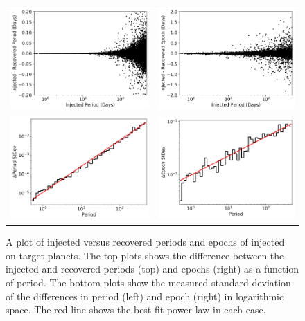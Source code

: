 \begin{figure}[ht]
\centering
\begin{tabular}{cc}
\includegraphics[width=0.5\linewidth]{INJ1-Ephem-Recovery-1.pdf} &
\includegraphics[width=0.5\linewidth]{INJ1-Ephem-Recovery-2.pdf} \\
\includegraphics[width=0.5\linewidth]{INJ1-Ephem-Recovery-3.pdf} &
\includegraphics[width=0.5\linewidth]{INJ1-Ephem-Recovery-4.pdf}
\end{tabular}
\caption{A plot of injected versus recovered periods and epochs of injected on-target planets. The top plots shows the difference between the injected and recovered periods (top) and epochs (right) as a function of period. The bottom plots show the measured standard deviation of the differences in period (left) and epoch (right) in logarithmic space. The red line shows the best-fit power-law in each case.}
\label{injephemfig}
\end{figure}


